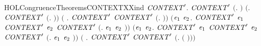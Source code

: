 \begin{SaveVerbatim}{HOLCongruenceTheoremsCONTEXTXXind}
\HOLTokenTurnstile{} \HOLSymConst{\HOLTokenForall{}}\ensuremath{\HOLBoundVar{CONTEXT}\sp{\prime}}.
       \ensuremath{\HOLBoundVar{CONTEXT}\sp{\prime}} \ensuremath{(}\HOLTokenLambda{}. \ensuremath{)} \HOLSymConst{\HOLTokenConj{}} \ensuremath{(}\HOLSymConst{\HOLTokenForall{}}. \ensuremath{\HOLBoundVar{CONTEXT}\sp{\prime}} \ensuremath{(}\HOLTokenLambda{}. \ensuremath{)}\ensuremath{)} \HOLSymConst{\HOLTokenConj{}}
       \ensuremath{(}\HOLSymConst{\HOLTokenForall{}} . \ensuremath{\HOLBoundVar{CONTEXT}\sp{\prime}}  \HOLSymConst{\HOLTokenImp{}} \ensuremath{\HOLBoundVar{CONTEXT}\sp{\prime}} \ensuremath{(}\HOLTokenLambda{}. \HOLSymConst{\ensuremath{\ldotp}} \ensuremath{)}\ensuremath{)} \HOLSymConst{\HOLTokenConj{}}
       \ensuremath{(}\HOLSymConst{\HOLTokenForall{}}\ensuremath{\HOLBoundVar{e}\sb{\mathrm{1}}} \ensuremath{\HOLBoundVar{e}\sb{\mathrm{2}}}.
            \ensuremath{\HOLBoundVar{CONTEXT}\sp{\prime}} \ensuremath{\HOLBoundVar{e}\sb{\mathrm{1}}} \HOLSymConst{\HOLTokenConj{}} \ensuremath{\HOLBoundVar{CONTEXT}\sp{\prime}} \ensuremath{\HOLBoundVar{e}\sb{\mathrm{2}}} \HOLSymConst{\HOLTokenImp{}}
            \ensuremath{\HOLBoundVar{CONTEXT}\sp{\prime}} \ensuremath{(}\HOLTokenLambda{}. \ensuremath{\HOLBoundVar{e}\sb{\mathrm{1}}}  \HOLSymConst{\ensuremath{+}} \ensuremath{\HOLBoundVar{e}\sb{\mathrm{2}}} \ensuremath{)}\ensuremath{)} \HOLSymConst{\HOLTokenConj{}}
       \ensuremath{(}\HOLSymConst{\HOLTokenForall{}}\ensuremath{\HOLBoundVar{e}\sb{\mathrm{1}}} \ensuremath{\HOLBoundVar{e}\sb{\mathrm{2}}}.
            \ensuremath{\HOLBoundVar{CONTEXT}\sp{\prime}} \ensuremath{\HOLBoundVar{e}\sb{\mathrm{1}}} \HOLSymConst{\HOLTokenConj{}} \ensuremath{\HOLBoundVar{CONTEXT}\sp{\prime}} \ensuremath{\HOLBoundVar{e}\sb{\mathrm{2}}} \HOLSymConst{\HOLTokenImp{}}
            \ensuremath{\HOLBoundVar{CONTEXT}\sp{\prime}} \ensuremath{(}\HOLTokenLambda{}. \ensuremath{\HOLBoundVar{e}\sb{\mathrm{1}}}  \HOLSymConst{\ensuremath{\mid}} \ensuremath{\HOLBoundVar{e}\sb{\mathrm{2}}} \ensuremath{)}\ensuremath{)} \HOLSymConst{\HOLTokenConj{}}
       \ensuremath{(}\HOLSymConst{\HOLTokenForall{}} . \ensuremath{\HOLBoundVar{CONTEXT}\sp{\prime}}  \HOLSymConst{\HOLTokenImp{}} \ensuremath{\HOLBoundVar{CONTEXT}\sp{\prime}} \ensuremath{(}\HOLTokenLambda{}.   \ensuremath{(} \ensuremath{)}\ensuremath{)}\ensuremath{)} \HOLSymConst{\HOLTokenConj{}}

\end{SaveVerbatim}
